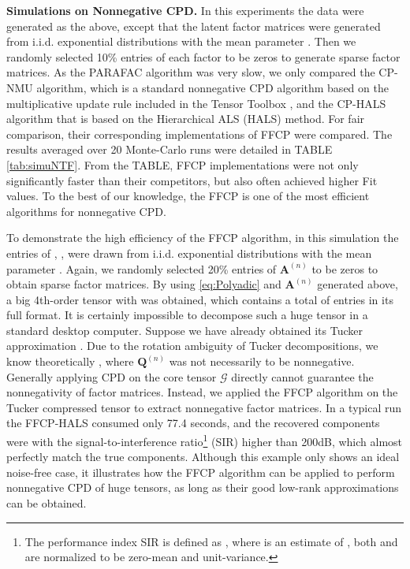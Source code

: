 \documentclass[10pt,twocolumn,twoside]{IEEEtran}
\newcommand{\tensor}[1]{\ensuremath{\boldsymbol{\mathscr{#1}}}}
\newcommand{\matn}[2][n]{\ensuremath{\mathbf{#2}^{(#1)}}}
\begin{document}
{\bf Simulations on Nonnegative CPD.}  In this experiments the data were generated as the above, except that the latent factor matrices were generated from i.i.d. exponential distributions with the mean parameter . Then we randomly selected 10\% entries of each factor to be zeros to generate sparse factor matrices. As the PARAFAC algorithm was very slow, we only compared the CP-NMU algorithm, which is a standard nonnegative CPD algorithm based on the multiplicative update rule included in the Tensor Toolbox \cite{KoldaTensorToolbox}, and the CP-HALS algorithm \cite{TensorHALS2009} that is based on the Hierarchical  ALS (HALS) method. For fair comparison, their corresponding implementations of FFCP were compared. The results averaged over 20 Monte-Carlo runs were detailed in TABLE \ref{tab:simuNTF}. From the TABLE, FFCP implementations were not only significantly faster than their competitors, but also often achieved higher Fit values. To the best of our knowledge, the FFCP is one of the most efficient algorithms for nonnegative CPD.



To demonstrate the high efficiency of the FFCP algorithm, in this simulation the entries of , , were drawn from i.i.d. exponential distributions with the mean parameter . Again, we randomly selected 20\% entries of \matn{A} to be zeros to obtain sparse factor matrices. By using \eqref{eq:Polyadic} and \matn{A} generated above, a big 4th-order tensor  with  was obtained, which contains a total of  entries in its full format. It is certainly impossible to decompose such a huge tensor in a standard desktop computer. Suppose we have already obtained its Tucker approximation . Due to the rotation ambiguity of Tucker decompositions, we know theoretically , where \matn{Q} was not necessarily to be nonnegative. Generally applying CPD on the core tensor \tensor{G} directly cannot guarantee the nonnegativity of factor matrices. Instead, we applied the FFCP algorithm on the Tucker compressed tensor  to extract nonnegative factor matrices. In a typical run the FFCP-HALS consumed only 77.4 seconds, and the recovered components were with the signal-to-interference ratio\footnote{The performance index SIR is defined as , where  is an estimate of , both  and  are normalized to be zero-mean and unit-variance.} (SIR) higher than 200dB, which almost perfectly match the true components. Although this example only shows an ideal noise-free case, it illustrates how the FFCP algorithm can be applied to perform nonnegative CPD of huge tensors, as long as their good low-rank approximations can be obtained.
\end{document}
